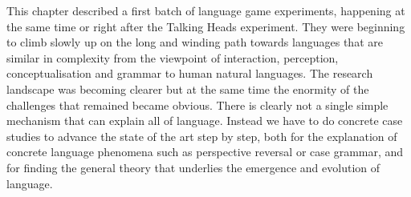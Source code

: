 This chapter described a first batch of language game experiments, happening at the same time or right after the Talking Heads 
experiment. They were beginning to climb slowly up on the long and winding path towards languages that are similar in 
complexity from the viewpoint of interaction, perception, conceptualisation and grammar to human natural languages. 
The research landscape was becoming clearer but at the same time the enormity of the challenges that remained
became obvious. There is clearly not a single simple mechanism that can explain all of language. Instead we have 
to do concrete case studies to advance the state of the art step by step, both for the explanation of concrete language 
phenomena such as perspective reversal or case grammar, and for finding the general theory that underlies the 
emergence and evolution of language. 


